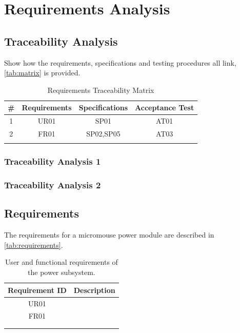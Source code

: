 \documentclass[class=report,11pt,crop=false]{standalone}
\begin{document}
\chapter{Requirements Analysis} \label{ch:reqAnalysis}
\vspace{-1cm}
\section{Traceability Analysis}
Show how the requirements, specifications and testing procedures all link, \autoref{tab:matrix} is provided.

\begin{table}[h]
    \centering
    \caption{Requirements Traceability Matrix}
    \label{tab:matrix}
    \begin{tabular}{|c|c|c|c|}
        \hline
        \# & Requirements & Specifications  & Acceptance Test\\
        \hline
         1 & UR01 &  SP01 & AT01 \\
         \hline
         2 & FR01 & SP02,SP05 & AT03 \\
         \hline
         & &  & \\
         \hline
    \end{tabular}
\end{table}

\subsection{Traceability Analysis 1}

\subsection{Traceability Analysis 2}

\section{Requirements}
The requirements for a micromouse power module are described in \autoref{tab:requirements}.
\begin{table}[h]
    \centering
    \caption{User and functional requirements of the power subsystem.}    \label{tab:requirements}
    \begin{tabular}{|c|l|}
        \hline
        \textbf{ Requirement ID} & \textbf{Description} \\
        \hline
         UR01 & \\
         \hline
         FR01 & \\
         \hline
         &  \\
         \hline
         &  \\
         \hline
    \end{tabular}
\end{table}
\end{document}
